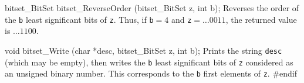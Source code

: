bitset_BitSet bitset_ReverseOrder (bitset_BitSet z, int b);
\endcode
\tab Reverses the order of the {\tt b} least significant bits of {\tt z}.
  Thus, if {\tt b}${}=4$ and {\tt z}${} = \dots 0011$, the returned value is $\dots 1100$.
 \endtab
\code

void bitset_Write (char *desc, bitset_BitSet z, int b);
\endcode
  \tab  {}
  Prints the string {\tt desc} (which may be empty), then writes the {\tt b}
	least significant bits of {\tt z} considered as an unsigned binary number.
  This corresponds to the {\tt b} first elements of {\tt z}.
 \endtab
\code\hide
#endif
\endhide\endcode
